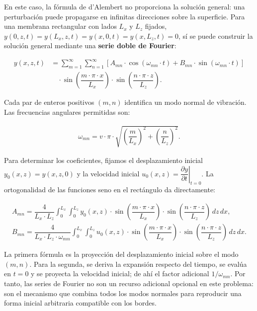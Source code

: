 \documentclass[
  spanish,
]{article}
\begin{document}
En este caso, la fórmula de d'Alembert no proporciona la solución
general: una perturbación puede propagarse en infinitas direcciones
sobre la superficie. Para una membrana rectangular con lados \(L_x\) y
\(L_z\) fijados, \(y(0,z,t)=y(L_x,z,t)=y(x,0,t)=y(x,L_z,t)=0\), sí se
puede construir la solución general mediante una \textbf{serie doble de
Fourier}:

\[
\begin{aligned}
y(x,z,t)
&= \sum_{m=1}^{\infty} \sum_{n=1}^{\infty}
\left[A_{mn} \cdot \cos(\omega_{mn} \cdot t) + B_{mn} \cdot \sin(\omega_{mn} \cdot t)\right] \\
&\quad \cdot \sin\left(\dfrac{m \cdot \pi \cdot x}{L_x}\right)
\cdot \sin\left(\dfrac{n \cdot \pi \cdot z}{L_z}\right).
\end{aligned}
\]

Cada par de enteros positivos \((m,n)\) identifica un modo normal de
vibración. Las frecuencias angulares permitidas son:

\[
\begin{aligned}
\omega_{mn} = v \cdot \pi \cdot \sqrt{\left(\dfrac{m}{L_x}\right)^2 + \left(\dfrac{n}{L_z}\right)^2}.
\end{aligned}
\]

Para determinar los coeficientes, fijamos el desplazamiento inicial
\(y_0(x,z)=y(x,z,0)\) y la velocidad inicial
\(u_0(x,z)=\left.\dfrac{\partial y}{\partial t}\right|_{t=0}\). La
ortogonalidad de las funciones seno en el rectángulo da directamente:

\[
\begin{aligned}
A_{mn}
= \dfrac{4}{L_x \cdot L_z}
\int_0^{L_x}\int_0^{L_z}
y_0(x,z)
\cdot \sin\left(\dfrac{m \cdot \pi \cdot x}{L_x}\right)
\cdot \sin\left(\dfrac{n \cdot \pi \cdot z}{L_z}\right)
\, dz\, dx,
\\
B_{mn}
= \dfrac{4}{L_x \cdot L_z \cdot \omega_{mn}}
\int_0^{L_x}\int_0^{L_z}
u_0(x,z)
\cdot \sin\left(\dfrac{m \cdot \pi \cdot x}{L_x}\right)
\cdot \sin\left(\dfrac{n \cdot \pi \cdot z}{L_z}\right)
\, dz\, dx.
\end{aligned}
\]

La primera fórmula es la proyección del desplazamiento inicial sobre el
modo \((m,n)\). Para la segunda, se deriva la expansión respecto del
tiempo, se evalúa en \(t=0\) y se proyecta la velocidad inicial; de ahí
el factor adicional \(1/\omega_{mn}\). Por tanto, las series de Fourier
no son un recurso adicional opcional en este problema: son el mecanismo
que combina todos los modos normales para reproducir una forma inicial
arbitraria compatible con los bordes.
\end{document}
